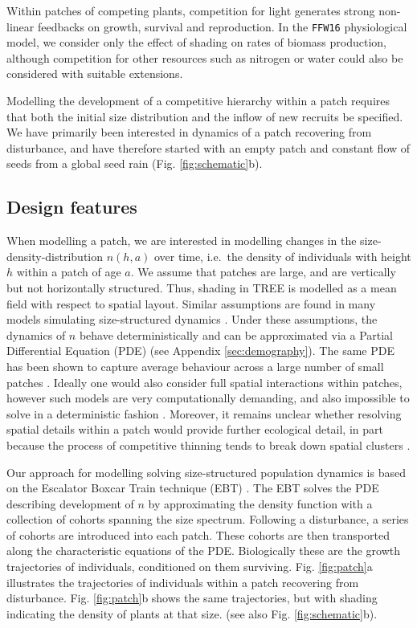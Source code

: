 \documentclass[]{article}
\begin{document}
Within patches of competing plants, competition for light generates
strong non-linear feedbacks on growth, survival and reproduction. In the
\texttt{FFW16} physiological model, we consider only the effect of
shading on rates of biomass production, although competition for other
resources such as nitrogen or water could also be considered with
suitable extensions.

Modelling the development of a competitive hierarchy within a patch
requires that both the initial size distribution and the inflow of new
recruits be specified. We have primarily been interested in dynamics of
a patch recovering from disturbance, and have therefore started with an
empty patch and constant flow of seeds from a global seed rain (Fig.
\ref{fig:schematic}b).

\subsection{Design features}\label{design-features-1}

When modelling a patch, we are interested in modelling changes in the
size-density-distribution \(n(h,a)\) over time, i.e.~the density of
individuals with height \(h\) within a patch of age \(a\). We assume
that patches are large, and are vertically but not horizontally
structured. Thus, shading in TREE is modelled as a mean field with
respect to spatial layout. Similar assumptions are found in many models
simulating size-structured dynamics
\citep{Moorcroft-2001, Huston-1987, Smith-2014}. Under these
assumptions, the dynamics of \(n\) behave deterministically and can be
approximated via a Partial Differential Equation (PDE) (see Appendix
\ref{sec:demography}). The same PDE has been shown to capture average behaviour
across a large number of small patches \citep{Moorcroft-2001}. Ideally
one would also consider full spatial interactions within patches,
however such models are very computationally demanding, and also
impossible to solve in a deterministic fashion \citep{Pacala-1996}.
Moreover, it remains unclear whether resolving spatial details within a
patch would provide further ecological detail, in part because the
process of competitive thinning tends to break down spatial clusters
\citep{Strigul-2008}.

Our approach for modelling solving size-structured population dynamics
is based on the Escalator Boxcar Train technique (EBT)
\citep{Deroos-1997, Deroos-1992, Deroos-1988}. The EBT solves the PDE
describing development of \(n\) by approximating the density function
with a collection of cohorts spanning the size spectrum. Following a
disturbance, a series of cohorts are introduced into each patch. These
cohorts are then transported along the characteristic equations of the
PDE. Biologically these are the growth trajectories of individuals,
conditioned on them surviving. Fig. \ref{fig:patch}a illustrates the
trajectories of individuals within a patch recovering from disturbance.
Fig. \ref{fig:patch}b shows the same trajectories, but with shading
indicating the density of plants at that size. (see also Fig.
\ref{fig:schematic}b).
\end{document}

